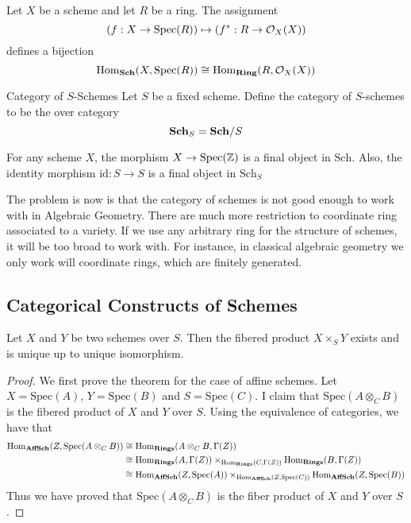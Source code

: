 \documentclass[a4paper]{article}
\begin{document}
\begin{thm}{}{} Let $X$ be a scheme and let $R$ be a ring. The assignment $$\left(f:X\to\text{Spec}(R)\right)\mapsto\left(f^\ast:R\to\mathcal{O}_X(X)\right)$$ defines a bijection $$\operatorname{Hom}_{\bold{Sch}}(X,\text{Spec}(R))\cong\operatorname{Hom}_\bold{Ring}(R,\mathcal{O}_X(X))$$
\end{thm}

\begin{defn}{Category of $S$-Schemes}{} Let $S$ be a fixed scheme. Define the category of $S$-schemes to be the over category $$\bold{Sch}_S=\bold{Sch}/S$$
\end{defn}

\begin{lmm}{}{} For any scheme $X$, the morphism $X\to\text{Spec}(\mathbb{Z})$ is a final object in $\text{Sch}$. Also, the identity morphism $\text{id}:S\to S$ is a final object in $\text{Sch}_S$
\end{lmm}

The problem is now is that the category of schemes is not good enough to work with in Algebraic Geometry. There are much more restriction to coordinate ring associated to a variety. If we use any arbitrary ring for the structure of schemes, it will be too broad to work with. For instance, in classical algebraic geometry we only work will coordinate rings, which are finitely generated. 

\subsection{Categorical Constructs of Schemes}
\begin{thm}{}{} Let $X$ and $Y$ be two schemes over $S$. Then the fibered product $X\times_SY$ exists and is unique up to unique isomorphism. \tcbline
\begin{proof}
We first prove the theorem for the case of affine schemes. Let $X=\text{Spec}(A)$, $Y=\text{Spec}(B)$ and $S=\text{Spec}(C)$. I claim that $\text{Spec}(A\otimes_CB)$ is the fibered product of $X$ and $Y$ over $S$. Using the equivalence of categories, we have that 
\begin{align*}
\operatorname{Hom}_\bold{AffSch}(Z,\text{Spec}(A\otimes_CB))&\cong\operatorname{Hom}_\bold{Rings}(A\otimes_CB,\Gamma(Z))\\
&\cong\operatorname{Hom}_\bold{Rings}(A,\Gamma(Z))\times_{\operatorname{Hom}_\bold{Rings}(C,\Gamma(Z))}\operatorname{Hom}_\bold{Rings}(B,\Gamma(Z))\\
&\cong\operatorname{Hom}_\bold{AffSch}(Z,\text{Spec}(A))\times_{\operatorname{Hom}_\bold{AffSch}(Z,\text{Spec}(C))}\operatorname{Hom}_\bold{AffSch}(Z,\text{Spec}(B))
\end{align*}
Thus we have proved that $\text{Spec}(A\otimes_CB)$ is the fiber product of $X$ and $Y$ over $S$. 
\end{proof}
\end{thm}
\end{document}
